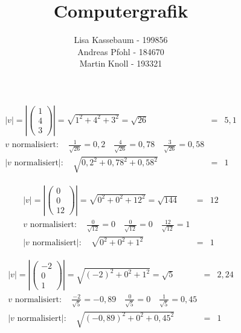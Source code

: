 \documentclass[a4paper]{article}
\title{Computergrafik}
\author{Lisa Kassebaum - 199856 \\ Andreas Pfohl - 184670 \\ Martin Knoll - 193321 }
\date{}
\begin{document}
\maketitle
\section{}
\subsection{}
  \begin{align*}
    \left|v\right|
    =
    \left|
    \begin{pmatrix}
      1 \\ 4 \\ 3
    \end{pmatrix}
    \right|
    =
    \sqrt{1^2 + 4^2 + 3^2}
    = \sqrt{26} &=& 5,1
    \\[1em]
    v\text{ normalisiert}: \quad \frac{1}{\sqrt{26}} = 0,2 \quad \frac{4}{\sqrt{26}} = 0,78 \quad \frac{3}{\sqrt{26}} = 0,58
    \\[1em]
    \left|v\text{ normalisiert}\right|: \quad \sqrt{0,2^2 + 0,78^2 + 0,58^2} &=& 1
  \end{align*}

  \begin{align*}
    \left|v\right|
    =
    \left|
    \begin{pmatrix}
      0 \\ 0 \\ 12
    \end{pmatrix}
    \right|
    =
    \sqrt{0^2 + 0^2 + 12^2}
    = \sqrt{144} &=& 12
    \\[1em]
    v\text{ normalisiert}: \quad \frac{0}{\sqrt{12}} = 0 \quad \frac{0}{\sqrt{12}} = 0 \quad \frac{12}{\sqrt{12}} = 1
    \\[1em]
    \left|v\text{ normalisiert}\right|: \quad \sqrt{0^2 + 0^2 + 1^2} &=& 1
  \end{align*}

  \begin{align*}
    \left|v\right|
    =
    \left|
    \begin{pmatrix}
      -2 \\ 0 \\ 1
    \end{pmatrix}
    \right|
    =
    \sqrt{(-2)^2 + 0^2 + 1^2}
    = \sqrt{5} &=& 2,24
    \\[1em]
    v\text{ normalisiert}: \quad \frac{-2}{\sqrt{5}} = -0,89 \quad \frac{0}{\sqrt{5}} = 0 \quad \frac{1}{\sqrt{5}} = 0,45
    \\[1em]
    \left|v\text{ normalisiert}\right|: \quad \sqrt{(-0,89)^2 + 0^2 + 0,45^2} &=& 1
  \end{align*}
\end{document}
